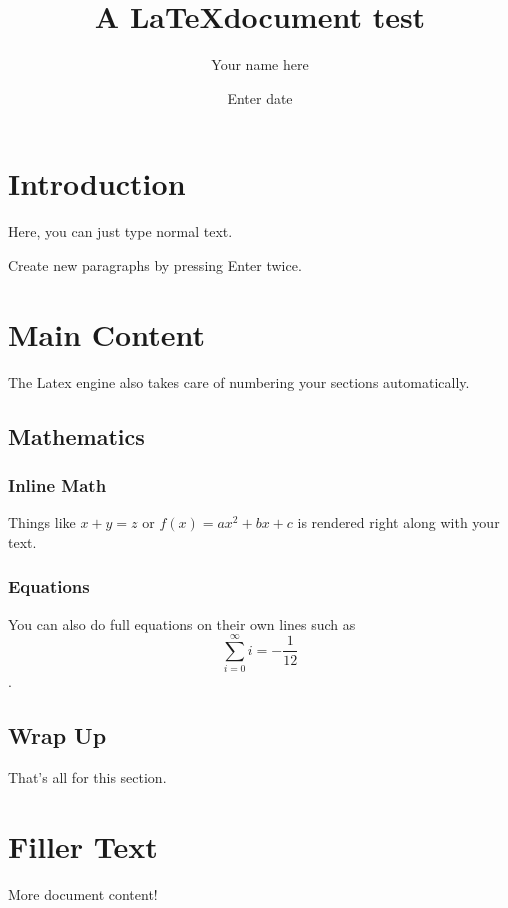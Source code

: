 \documentclass[11pt,letterpaper]{article}
\author{Your name here}
\date{Enter date}
\title{A \LaTeX document test}
\begin{document}
\maketitle
\newpage

\tableofcontents
\newpage

\section{Introduction}
Here, you can just type normal text.

Create new paragraphs by pressing Enter twice.
\newpage

\section{Main Content}
The Latex engine also takes care of numbering your sections automatically. 
    \subsection{Mathematics}

        \subsubsection{Inline Math}

        Things like $x+y = z$ or $f(x)=ax^2 + bx + c$ is rendered right along with your text.

        \subsubsection{Equations}
        You can also do full equations on their own lines such as $$ \sum_{i=0}^\infty i = -\frac{1}{12} $$.

    \subsection{Wrap Up}
    That's all for this section.

\section{Filler Text}
More document content!
\end{document}
